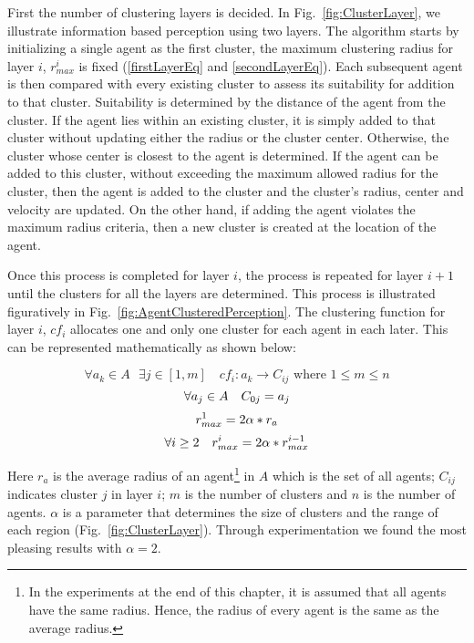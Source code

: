 First the number of clustering layers is decided. In Fig.~\ref{fig:ClusterLayer}, we illustrate information based perception using two layers. The algorithm starts by initializing a single agent as the first cluster, the maximum clustering radius for layer $i$, $r^{i}_{max}$ is fixed (\ref{firstLayerEq} and \ref{secondLayerEq}). Each subsequent agent is then compared with every existing cluster to assess its suitability for addition to that cluster. Suitability is determined by the distance of the agent from the cluster. If the agent lies within an existing cluster, it is simply added to that cluster without updating either the radius or the cluster center. Otherwise, the cluster whose center is closest to the agent is determined. If the agent can be added to this cluster, without exceeding the maximum allowed radius for the cluster, then the agent is added to the cluster and the cluster's radius, center and velocity are updated. On the other hand, if adding the agent violates the maximum radius criteria, then a new cluster is created at the location of the agent.

Once this process is completed for layer $i$, the process is repeated for layer $i+1$ until the clusters for all the layers are determined. This process is illustrated figuratively in Fig.~\ref{fig:AgentClusteredPerception}. The clustering function for layer $i$, $cf_{i}$ allocates one and only one cluster for each agent in each later. This can be represented mathematically as shown below:

\begin{equation}
   \forall a_{k} {\in} A \mbox{ }\exists j \in  [1 , m] \quad cf_{i} : a_{k} {\rightarrow} C_{ij} \mbox{ where } 1 {\leq} m {\leq} n
\end{equation}
\begin{equation}
  \\ \forall a_{j} \in A \quad C_{0j} = a_{j}
\end{equation}
\begin{equation}
 \\r^{1}_{max} = 2 \alpha * r_{a}
  \label{firstLayerEq}
\end{equation}
\begin{equation}
  \\ \forall i \geq 2 \quad   r^{i}_{max} = 2 \alpha * r ^{i-1} _{max}
   \label{secondLayerEq}
\end{equation}

Here $r_{a}$ is the average radius of an agent\footnote{In the experiments at the end of this chapter, it is assumed that all agents have the same radius. Hence, the radius of every agent is the same as the average radius.} in $A$ which is the set of all agents; $C_{ij}$ indicates cluster $j$ in layer $i$; $m$ is the number of clusters and $n$ is the number of agents. $\alpha$ is a parameter that determines the size of clusters and the range of each region (Fig.~\ref{fig:ClusterLayer}). Through experimentation we found the most pleasing results with $\alpha = 2$.

